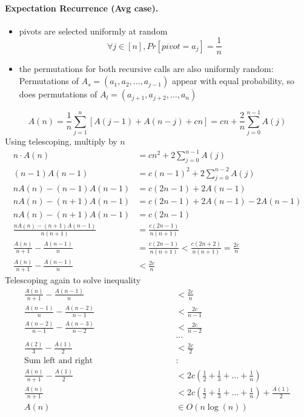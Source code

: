 \documentclass[9pt]{extarticle}
\begin{document}
\paragraph{Expectation Recurrence (Avg case).}
\begin{itemize}
  \item pivots are selected uniformly at random
\[\forall j \in [n], Pr[pivot = a_j] = \frac{1}{n}\]
  \item the permutations for both recursive calls are also uniformly random: \\
Permutations of $A_s = (a_1, a_2, \dots, a_{j-1})$ appear with equal probability, so does permutations of $A_l = (a_{j+1}, a_{j+2}, \dots, a_n)$
\end{itemize}
\[A(n) = \frac{1}{n} \sum_{j=1}^{n} [A(j-1) + A(n-j) + cn] = cn + \frac{2}{n}\sum_{j=0}^{n-1}A(j)\]
Using telescoping, multiply by $n$
\begin{align*}
n\cdot A(n) &= cn^2 + 2\sum_{j=0}^{n-1}A(j)\\
(n-1) A(n-1)&= c(n-1)^2 + 2\sum_{j=0}^{n-2}A(j)\\
nA(n) - (n-1)A(n-1) &= c(2n-1) + 2A(n-1)\\
nA(n) - (n+1)A(n-1) &= c(2n-1) + 2A(n-1) - 2A(n-1)\\
nA(n) - (n+1)A(n-1) &= c(2n-1)\\
\frac{nA(n) - (n+1)A(n-1)}{n(n+1)} &= \frac{c(2n-1)}{n(n+1)}\\
\frac{A(n)}{n+1}-\frac{A(n-1)}{n} &= \frac{c(2n-1)}{n(n+1)} < \frac{c(2n+2)}{n(n+1)}=\frac{2c}{n}\\
\frac{A(n)}{n+1}-\frac{A(n-1)}{n} &< \frac{2c}{n}
\end{align*}
Telescoping again to solve inequality
\begin{align*}
\frac{A(n)}{n+1}-\frac{A(n-1)}{n} &< \frac{2c}{n}\\
\frac{A(n-1)}{n} - \frac{A(n-2)}{n-1} &< \frac{2c}{n-1}\\
\frac{A(n-2)}{n-1} - \frac{A(n-3)}{n-2} &< \frac{2c}{n-2}\\
&...\\
\frac{A(2)}{3} - \frac{A(1)}{2} &< \frac{2c}{2}\\
\text{Sum left and right}\quad\quad\quad\quad\quad\quad\quad\quad\quad&:\\
\frac{A(n)}{n+1} - \frac{A(1)}{2} &< 2c(\frac{1}{2} + \frac{1}{3} + \dots + \frac{1}{n})\\
\frac{A(n)}{n+1}&< 2c(\frac{1}{2} + \frac{1}{3} + \dots + \frac{1}{n}) + \frac{A(1)}{2}\\
A(n) &\in O(n\log(n))
\end{align*}
\end{document}
